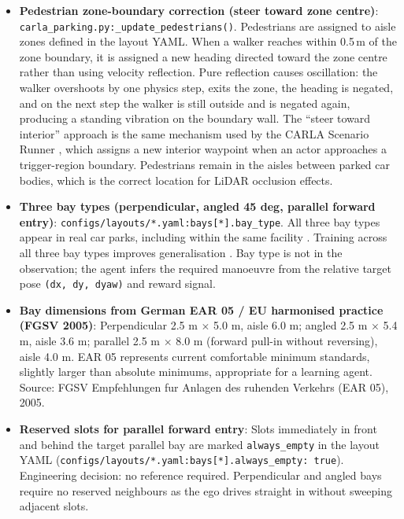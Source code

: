 \documentclass[11pt,a4paper]{article}
\begin{document}
\begin{itemize}[leftmargin=*]
  \item \textbf{Pedestrian zone-boundary correction (steer toward zone centre)}:
        \texttt{carla\_parking.py:\_update\_pedestrians()}.
        Pedestrians are assigned to aisle zones defined in the layout YAML.
        When a walker reaches within 0.5\,m of the zone boundary, it is assigned
        a new heading directed toward the zone centre rather than using velocity
        reflection.
        Pure reflection causes oscillation: the walker overshoots by one physics
        step, exits the zone, the heading is negated, and on the next step the
        walker is still outside and is negated again, producing a standing
        vibration on the boundary wall.
        The ``steer toward interior'' approach is the same mechanism used by the
        CARLA Scenario Runner \cite{carla_scenario_runner}, which assigns a new
        interior waypoint when an actor approaches a trigger-region boundary.
        Pedestrians remain in the aisles between parked car bodies, which is
        the correct location for LiDAR occlusion effects.

  \item \textbf{Three bay types (perpendicular, angled 45 deg, parallel forward entry)}:
        \texttt{configs/layouts/*.yaml:bays[*].bay\_type}.
        All three bay types appear in real car parks, including within the same
        facility \cite{ced_parking_design}. Training across all three bay types
        improves generalisation \cite{seg_parking2024}. Bay type is not in the
        observation; the agent infers the required manoeuvre from the relative
        target pose \texttt{(dx, dy, dyaw)} and reward signal.

  \item \textbf{Bay dimensions from German EAR 05 / EU harmonised practice (FGSV 2005)}:
        Perpendicular 2.5 m $\times$ 5.0 m, aisle 6.0 m;
        angled 2.5 m $\times$ 5.4 m, aisle 3.6 m;
        parallel 2.5 m $\times$ 8.0 m (forward pull-in without reversing), aisle 4.0 m.
        EAR 05 represents current comfortable minimum standards, slightly larger
        than absolute minimums, appropriate for a learning agent.
        Source: FGSV Empfehlungen fur Anlagen des ruhenden Verkehrs (EAR 05), 2005.

  \item \textbf{Reserved slots for parallel forward entry}:
        Slots immediately in front and behind the target parallel bay are marked
        \texttt{always\_empty} in the layout YAML
        (\texttt{configs/layouts/*.yaml:bays[*].always\_empty: true}).
        Engineering decision: no reference required. Perpendicular and angled
        bays require no reserved neighbours as the ego drives straight in without
        sweeping adjacent slots.
\end{itemize}
\end{document}
